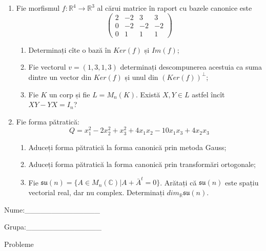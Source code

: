 \documentclass{article}
\begin{document}
\begin{enumerate}
 \item Fie morfismul $f:\mathbb{R}^4 \to \mathbb{R}^3$ al cărui matrice în raport cu bazele canonice este
$$\begin{pmatrix}
2&-2&3&3\\
0&-2&-2&-2\\
0&1&1&1
\end{pmatrix}$$

\begin{enumerate}
\item Determinați cîte o bază în $Ker(f)$ și $Im(f)$;
\item Fie vectorul $v=(1,3,1,3)$ determinați descompunerea acestuia ca suma dintre un vector din $Ker(f)$ și unul din $(Ker(f))^\perp$;
\item Fie $K$ un corp și fie $L=M_n(K)$. Există $X,Y \in L$ astfel încît $XY-YX=I_n$?  
\end{enumerate}
\item Fie forma pătratică:
$$Q= x_1^2-2x_2^2+x_3^2+4x_1x_2-10x_1x_3+4x_2x_3$$

\begin{enumerate}
\item Aduceți forma pătratică la forma canonică prin metoda Gauss;
\item Aduceți forma pătratică la forma canonică prin transformări ortogonale;
\item Fie $\mathfrak{su}(n)=\{ A \in M_n(\mathbb{C}) | A+\bar{A}^t=0\}$. Arătați că $\mathfrak{su}(n)$ este spațiu vectorial real, dar nu complex.
Determinați $dim_{\mathbb{R}}\mathfrak{su}(n)$.
\end{enumerate}
\end{enumerate}
\newpage
\begin{flushright}
Nume:\_\_\_\_\_\_\_\_\_\_\_\_\_\_
 
 
Grupa:\_\_\_\_\_\_\_\_\_\_\_\_\_\_
\end{flushright}
\begin{center}
\vspace{2cm}
{\Large Probleme}
\vspace{2cm}
\end{center}
\end{document}
